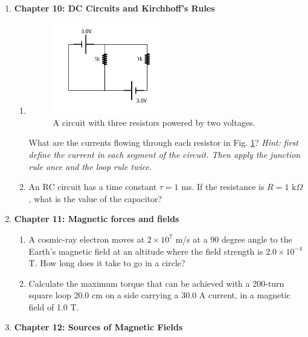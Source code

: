 \documentclass[10pt]{article}
\begin{document}
\begin{enumerate}
\item \textbf{Chapter 10: DC Circuits and Kirchhoff's Rules}
\begin{enumerate}
\item 
\begin{figure}[ht]
\centering
\includegraphics[width=0.5\textwidth]{iV.pdf}
\caption{\label{fig:circuit1} A circuit with three resistors powered by two voltages.}
\end{figure}
What are the currents flowing through each resistor in Fig. \ref{fig:circuit1}? \textit{Hint: first define the current in each segment of the circuit.  Then apply the junction rule once and the loop rule twice.}\\ \vspace{10cm}
\item An RC circuit has a time constant $\tau = 1$ ms.  If the resistance is $R = 1$ k$\Omega$, what is the value of the capacitor? \\ \vspace{3cm}
\end{enumerate}
\item \textbf{Chapter 11: Magnetic forces and fields}
\begin{enumerate}
\item A cosmic-ray electron moves at $2 \times 10^7$ m/s at a 90 degree angle to the Earth’s magnetic field at an altitude where the field strength is $2.0 \times 10^{-4}$ T. How long does it take to go in a circle? \\ \vspace{3 cm}
\item Calculate the maximum torque that can be achieved with a 200-turn square loop 20.0 cm on a side carrying a 30.0 A current, in a magnetic field of 1.0 T. \\ \vspace{2cm}
\end{enumerate}
\item \textbf{Chapter 12: Sources of Magnetic Fields}

\end{enumerate}
\end{document}
